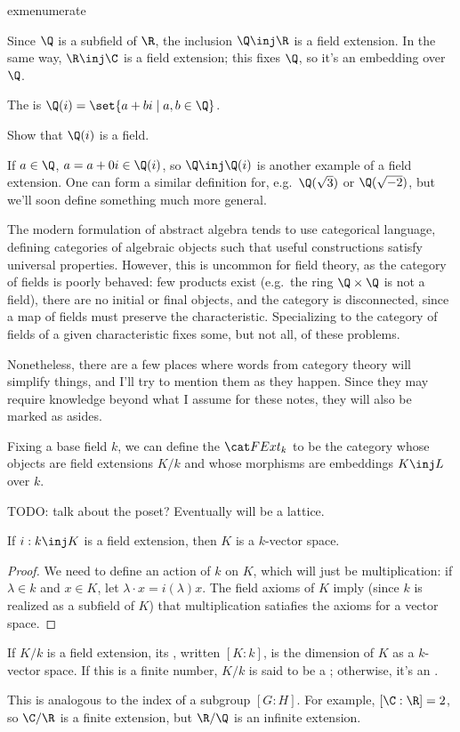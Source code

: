 \begin{comp}{exm}{enumerate}
\label{fieldextexm}
	\item Since $\Q$ is a subfield of $\R$, the inclusion $\Q\inj\R$ is a field extension. In the same way,
	$\R\inj\C$ is a field extension; this fixes $\Q$, so it's an embedding over $\Q$.
	\item\label{Gaussrat} The  is $\Q(i) = \set{a+bi\mid a,b\in\Q}$.
	\begin{ex}
	Show that $\Q(i)$ is a field.
	\end{ex}
	If $a\in\Q$, $a = a+0i\in\Q(i)$, so $\Q\inj\Q(i)$ is another example of a field extension. One can form a
	similar definition for, e.g.\ $\Q(\sqrt 3)$ or $\Q(\sqrt{-2})$, but we'll soon define something much more
	general.
\end{comp}
\begin{aside}
The modern formulation of abstract algebra tends to use categorical language, defining categories of algebraic
objects such that useful constructions satisfy universal properties. However, this is uncommon for field
theory, as the category of fields is poorly behaved: few products exist (e.g.\ the ring $\Q\times\Q$ is not a
field), there are no initial or final objects, and the category is disconnected, since a map of fields must
preserve the characteristic. Specializing to the category of fields of a given characteristic fixes some, but not
all, of these problems.

Nonetheless, there are a few places where words from category theory will simplify things, and I'll try to mention
them as they happen. Since they may require knowledge beyond what I assume for these notes, they will also be
marked as asides.

Fixing a base field $k$, we can define the  $\FExt_k$ to be the category whose
objects are field extensions $K/k$ and whose morphisms are embeddings $K\inj L$ over $k$.

{\color{red}TODO}: talk about the poset? Eventually will be a lattice.
\end{aside}
\begin{lem}
If $i:k\inj K$ is a field extension, then $K$ is a $k$-vector space.
\end{lem}
\begin{proof}
We need to define an action of $k$ on $K$, which will just be multiplication: if $\lambda\in k$ and $x\in K$, let
$\lambda\cdot x = i(\lambda)x$. The field axioms of $K$ imply (since $k$ is realized as a subfield of $K$) that
multiplication satiafies the axioms for a vector space.
\end{proof}
\begin{defn}
\label{finite_ext}
If $K/k$ is a field extension, its , written $[K:k]$, is the dimension of $K$ as a $k$-vector space.
If this is a finite number, $K/k$ is said to be a ; otherwise, it's an .
\end{defn}
This is analogous to the index of a subgroup $[G:H]$. For example, $[\C:\R] = 2$, so $\C/\R$ is a finite extension,
but $\R/\Q$ is an infinite extension.

